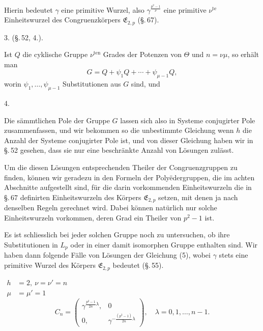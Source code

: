 Hierin bedeutet $\gamma$ eine primitive Wurzel, also $\gamma^{\frac{p^2-1}{\nu}}$
eine primitive $\nu^{\mathrm{te}}$ Einheitswurzel des Congruenzkörpers
$\mathfrak{E}_{2,p}$ (\S.\,67).

3. 
(\S.\,52, 4.).

Ist $Q$ die cyklische Gruppe $\nu^{\mathrm{ten}}$ Grades der Potenzen
von $\Theta$ und $n = \nu\mu$, so erhält man
\[
G = Q + \psi_1 Q + \cdots + \psi_{\mu-1} Q,
\]
worin $\psi_1, \ldots, \psi_{\mu-1}$ Substitutionen aus $G$ sind, und

4. 

Die sämmtlichen Pole der Gruppe $G$ lassen sich also in Systeme
conjugirter Pole zusammenfassen, und wir bekommen so die unbestimmte
Gleichung
wenn $h$ die Anzahl der Systeme conjugirter Pole ist, und von dieser
Gleichung haben wir in \S.\,52 gesehen, dass sie nur eine beschränkte
Anzahl von Lösungen zulässt.

Um die diesen Lösungen entsprechenden Theiler der Congruenzgruppen zu
finden, können wir geradezu in den Formeln der Polyëdergruppen, die im
achten Abschnitte aufgestellt sind, für die darin vorkommenden
Einheitswurzeln die in \S.\,67 definirten Einheitswurzeln des Körpers
$\mathfrak{E}_{2,p}$ setzen, mit denen ja nach denselben Regeln
gerechnet wird. Dabei können natürlich nur solche Einheitswurzeln
vorkommen, deren Grad ein Theiler von $p^2 - 1$ ist.

Es ist schliesslich bei jeder solchen Gruppe noch zu untersuchen, ob
ihre Substitutionen in $L_p$ oder in einer damit isomorphen Gruppe
enthalten sind. Wir haben dann folgende Fälle von Lösungen der
Gleichung (5), wobei $\gamma$ stets eine primitive Wurzel des Körpers
$\mathfrak{E}_{2,p}$ bedeutet (\S.\,55).

\quad
$\begin{aligned} h &= 2,\ \nu = \nu' = n \\ \mu &= \mu' = 1 \end{aligned}$
\[
C_n = \begin{pmatrix} \gamma^{\frac{p^2-1}{2n}\lambda}, & 0 \\[2pt] 0, & \gamma^{-\frac{(p^2-1)}{2n}\lambda} \end{pmatrix},
\quad \lambda = 0, 1, \ldots, n-1.
\]
